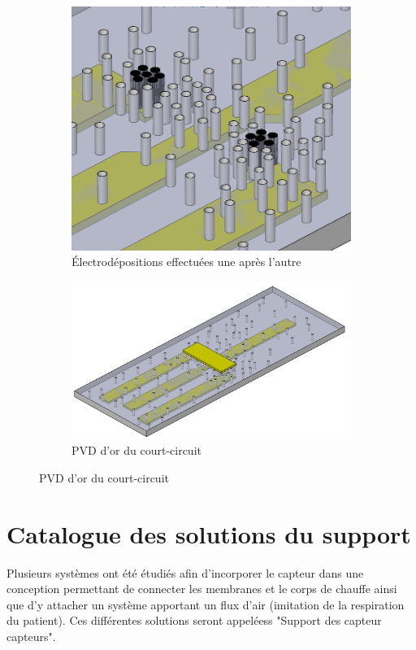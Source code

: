 \begin{itemize}
\begin{figure}[H]
\begin{subfigure}{0.45\textwidth}
                  \includegraphics[scale = 0.27]{assets/figures/ED_B.png}
                  \caption{Électrodépositions effectuées une après l'autre}
              \end{subfigure}
              \begin{subfigure}{0.45\textwidth}
                  \includegraphics[scale = 0.27]{assets/figures/Court_circuit_B.png}
                  \caption{PVD d'or du court-circuit}
              \end{subfigure}
          \end{figure}
\end{itemize}

\section{Catalogue des solutions du support}
\label{chap:catalogueSol}
Plusieurs systèmes ont été étudiés afin d'incorporer le capteur dans une conception permettant de connecter les membranes et le corps de chauffe
ainsi que d'y attacher un système apportant un flux d'air (imitation de la respiration du patient). Ces différentes solutions seront appeléess
"Support des capteur \gls{capteur}s".

